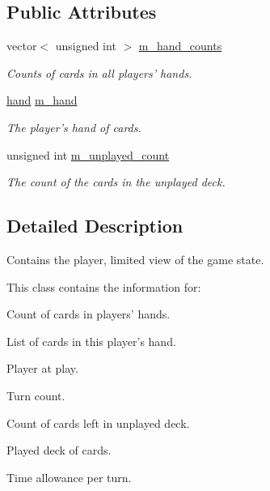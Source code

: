 \subsection*{\-Public \-Attributes}
\begin{DoxyCompactItemize}
\item 
\hypertarget{class_uno___p_state_a8e4b3ec3783d8ed58bd761ac6c7be3b6}{
vector$<$ unsigned int $>$ \hyperlink{class_uno___p_state_a8e4b3ec3783d8ed58bd761ac6c7be3b6}{m\-\_\-hand\-\_\-counts}}
\label{class_uno___p_state_a8e4b3ec3783d8ed58bd761ac6c7be3b6}

\begin{DoxyCompactList}\small\item\em \-Counts of cards in all players' hands. \end{DoxyCompactList}\item 
\hyperlink{uno__pstate_8h_acd9523c15e47a87e3740cf5ade73556e}{hand} \hyperlink{class_uno___p_state_ae83f531e09b87d69dccb49bf44af4e0a}{m\-\_\-hand}
\begin{DoxyCompactList}\small\item\em \-The player's hand of cards. \end{DoxyCompactList}\item 
unsigned int \hyperlink{class_uno___p_state_ab5532c7fefcd10fc39a7a07b627ff5c5}{m\-\_\-unplayed\-\_\-count}
\begin{DoxyCompactList}\small\item\em \-The count of the cards in the unplayed deck. \end{DoxyCompactList}\end{DoxyCompactItemize}


\subsection{\-Detailed \-Description}
\-Contains the player, limited view of the game state. 

\-This class contains the information for\-: \begin{DoxyItemize}
\item \-Count of cards in players' hands. \item \-List of cards in this player's hand. \item \-Player at play. \item \-Turn count. \item \-Count of cards left in unplayed deck. \item \-Played deck of cards. \item \-Time allowance per turn. \end{DoxyItemize}


